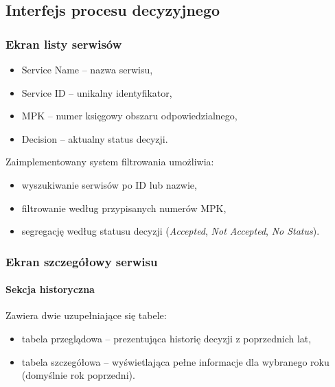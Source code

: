 \subsection{Interfejs procesu decyzyjnego}


\subsubsection{Ekran listy serwisów}
\begin{itemize}
    \item Service Name -- nazwa serwisu,
    \item Service ID -- unikalny identyfikator,
    \item MPK -- numer księgowy obszaru odpowiedzialnego,
    \item Decision -- aktualny status decyzji.
\end{itemize}

Zaimplementowany system filtrowania umożliwia:
\begin{itemize}
    \item wyszukiwanie serwisów po ID lub nazwie,
    \item filtrowanie według przypisanych numerów MPK,
    \item segregację według statusu decyzji (\emph{Accepted}, \emph{Not Accepted}, \emph{No Status}).
\end{itemize}

\subsubsection{Ekran szczegółowy serwisu}

\paragraph{Sekcja historyczna}
Zawiera dwie uzupełniające się tabele:
\begin{itemize}
    \item tabela przeglądowa -- prezentująca historię decyzji z poprzednich lat,
    \item tabela szczegółowa -- wyświetlająca pełne informacje dla wybranego roku (domyślnie rok poprzedni).
\end{itemize}

